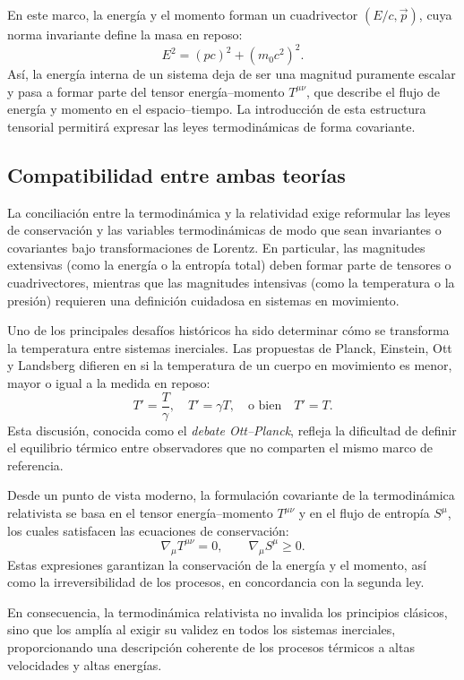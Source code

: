 En este marco, la energía y el momento forman un cuadrivector $(E/c, \vec{p})$, cuya norma invariante define la masa en reposo:
\[
E^2 = (pc)^2 + (m_0 c^2)^2.
\]
Así, la energía interna de un sistema deja de ser una magnitud puramente escalar y pasa a formar parte del tensor energía–momento $T^{\mu\nu}$, que describe el flujo de energía y momento en el espacio–tiempo.  
La introducción de esta estructura tensorial permitirá expresar las leyes termodinámicas de forma covariante.

\subsection{Compatibilidad entre ambas teorías}

La conciliación entre la termodinámica y la relatividad exige reformular las leyes de conservación y las variables termodinámicas de modo que sean invariantes o covariantes bajo transformaciones de Lorentz.  
En particular, las magnitudes extensivas (como la energía o la entropía total) deben formar parte de tensores o cuadrivectores, mientras que las magnitudes intensivas (como la temperatura o la presión) requieren una definición cuidadosa en sistemas en movimiento.

Uno de los principales desafíos históricos ha sido determinar cómo se transforma la temperatura entre sistemas inerciales.  
Las propuestas de Planck, Einstein, Ott y Landsberg difieren en si la temperatura de un cuerpo en movimiento es menor, mayor o igual a la medida en reposo:
\[
T' = \frac{T}{\gamma}, \quad T' = \gamma T, \quad \text{o bien} \quad T' = T.
\]
Esta discusión, conocida como el \textit{debate Ott–Planck}, refleja la dificultad de definir el equilibrio térmico entre observadores que no comparten el mismo marco de referencia.

Desde un punto de vista moderno, la formulación covariante de la termodinámica relativista se basa en el tensor energía–momento $T^{\mu\nu}$ y en el flujo de entropía $S^{\mu}$, los cuales satisfacen las ecuaciones de conservación:
\[
\nabla_{\mu} T^{\mu\nu} = 0, \qquad \nabla_{\mu} S^{\mu} \geq 0.
\]
Estas expresiones garantizan la conservación de la energía y el momento, así como la irreversibilidad de los procesos, en concordancia con la segunda ley.

En consecuencia, la termodinámica relativista no invalida los principios clásicos, sino que los amplía al exigir su validez en todos los sistemas inerciales, proporcionando una descripción coherente de los procesos térmicos a altas velocidades y altas energías.


